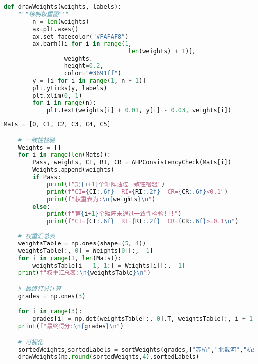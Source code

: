 \documentclass[withoutpreface]{cumcmthesis}
\begin{document}
    \begin{lstlisting}[language=python,caption={drawWeights函数}]
    def drawWeights(weights, labels):
    """绘制权重图"""
        n = len(weights)
        ax=plt.axes()
        ax.set_facecolor("#FAFAF8")
        ax.barh([i for i in range(1,
                                   len(weights) + 1)],
                 weights,
                 height=0.2,
                 color="#3691ff")
        y = [i for i in range(1, n + 1)]
        plt.yticks(y, labels)
        plt.xlim(0, 1)
        for i in range(n):
            plt.text(weights[i] + 0.01, y[i] - 0.03, weights[i])
    \end{lstlisting}

    \begin{lstlisting}[language=python,caption={AHP主体}]
    Mats = [O, C1, C2, C3, C4, C5]

    # 一致性检验
    Weights = []
    for i in range(len(Mats)):
        Pass, weights, CI, RI, CR = AHPConsistencyCheck(Mats[i])
        Weights.append(weights)
        if Pass:
            print(f"第{i+1}个矩阵通过一致性检验")
            print(f"CI={CI:.6f}  RI={RI:.2f}  CR={CR:.6f}<0.1")
            print(f"权重表为:\n{weights}\n")
        else:
            print(f"第{i+1}个矩阵未通过一致性检验!!!")
            print(f"CI={CI:.6f}  RI={RI:.2f}  CR={CR:.6f}>=0.1\n")
    
    # 权重汇总表
    weightsTable = np.ones(shape=(5, 4))
    weightsTable[:, 0] = Weights[0][:, -1]
    for i in range(1, len(Mats)):
        weightsTable[i - 1, 1:] = Weights[i][:, -1]
    print(f"权重汇总表:\n{weightsTable}\n")

    # 最终打分计算
    grades = np.ones(3)

    for i in range(3):
        grades[i] = np.dot(weightsTable[:, 0].T, weightsTable[:, i + 1])
    print(f"最终得分:\n{grades}\n")

    # 可视化
    sortedWeights,sortedLabels = sortWeights(grades,["苏杭","北戴河","杭州"])
    drawWeights(np.round(sortedWeights,4),sortedLabels)        
    \end{lstlisting}
\end{document}
